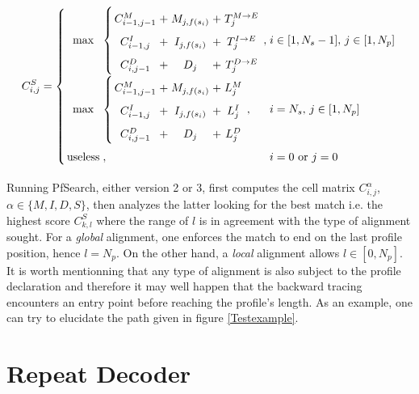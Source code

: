 \documentclass[a4paper,10pt,twoside]{scrartcl}
\begin{document}
\begin{equation} \label{std4} \arraycolsep=1.4pt\def\arraystretch{1.7}
  C_{i,j}^{S} = \left \{
		\begin{array}{c l l}
		  		
		  \max & \left \{
		  \begin{array} {ccccc}
		  C_{i-1,j-1}^{M} &+& M_{j, f(s_i)} &+& T^{M \rightarrow E}_j \\
		  C_{i-1,j}^{I}   &+& I_{j, f(s_i)} &+& T^{I \rightarrow E}_j \\
		  C_{i,j-1}^{D}   &+& D_{j} &+& T^{D \rightarrow E}_j \\
		  \end{array} \right. , & i \in [1,N_s-1],\, j \in [1,N_p]\\
		  
		  \max & \left \{
		  \begin{array} {ccccc}
		  C_{i-1,j-1}^{M} &+& M_{j, f(s_i)} &+& L^{M}_j \\
		  C_{i-1,j}^{I}   &+& I_{j, f(s_i)} &+& L^{I}_j \\
		  C_{i,j-1}^{D}   &+& D_{j} &+& L^{D}_j \\
		  \end{array} \right. , & i = N_s,\, j \in [1,N_p]\\
		  
		  \mathrm{useless} &,& i = 0 \,\,\mathrm{or}\,\, j = 0
		  
		\end{array}
		\right.
\end{equation}

Running PfSearch, either version 2 or 3, first computes the cell matrix $C^\alpha_{i,j}$, $\alpha \in \{M,I,D,S\}$, then 
analyzes the latter looking for the best match i.e. the highest score $C^S_{k,l}$ where the range of $l$ is in agreement with 
the type of alignment sought. For a \emph{global} alignment, one enforces the match to end on the last profile position, hence $l=N_p$. On the other hand, a \emph{local} alignment
allows $l \in [0,N_p]$. It is worth mentionning that any type of alignment is also subject to the profile declaration and therefore
it may well happen that the backward tracing encounters an entry point before reaching the profile's length. As an example, one
can try to elucidate the path given in figure \ref{Testexample}.

\section{Repeat Decoder}
\end{document}
